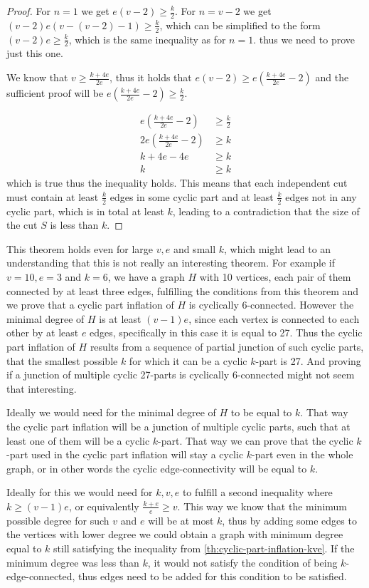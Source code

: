 \documentclass[12pt, twoside]{book}
\begin{document}
\begin{proof}
	For $n=1$ we get $e(v-2)\geq \frac{k}{2}$. For $n=v-2$ we get $(v-2)e(v-(v-2)-1)\geq\frac{k}{2}$, which can be simplified to the form $(v-2)e\geq\frac{k}{2}$, which is the same inequality as for $n=1$. thus we need to prove just this one.
	
	We know that $v\geq \frac{k+4e}{2e}$, thus it holds that $e(v-2)\geq e(\frac{k+4e}{2e}-2)$ and the sufficient proof will be $e(\frac{k+4e}{2e}-2)\geq \frac{k}{2}$.
	
	\begin{align*}
		e\left(\frac{k+4e}{2e}-2\right)&\geq \frac{k}{2} \\
		2e\left(\frac{k+4e}{2e}-2\right)&\geq k \\
		k+4e-4e&\geq k \\
		k&\geq k
	\end{align*}
	which is true thus the inequality holds. This means that each independent cut must contain at least $\frac{k}{2}$ edges in some cyclic part and at least $\frac{k}{2}$ edges not in any cyclic part, which is in total at least $k$, leading to a contradiction that the size of the cut $S$ is less than $k$.
\end{proof}

This theorem holds even for large $v,e$ and small $k$, which might lead to an understanding that this is not really an interesting theorem. For example if $v=10,e=3$ and $k=6$, we have a graph $H$ with 10 vertices, each pair of them connected by at least three edges, fulfilling the conditions from this theorem and we prove that a cyclic part inflation of $H$ is cyclically 6-connected. However the minimal degree of $H$ is at least $(v-1)e$, since each vertex is connected to each other by at least $e$ edges, specifically in this case it is equal to 27. Thus the cyclic part inflation of $H$ results from a sequence of partial junction of such cyclic parts, that the smallest possible $k$ for which it can be a cyclic $k$-part is 27. And proving if a junction of multiple cyclic 27-parts is cyclically 6-connected might not seem that interesting.

Ideally we would need for the minimal degree of $H$ to be equal to $k$. That way the cyclic part inflation will be a junction of multiple cyclic parts, such that at least one of them will be a cyclic $k$-part. That way we can prove that the cyclic $k$-part used in the cyclic part inflation will stay a cyclic $k$-part even in the whole graph, or in other words the cyclic edge-connectivity will be equal to $k$.

Ideally for this we would need for $k,v,e$ to fulfill a second inequality where ${k\geq (v-1)e}$, or equivalently $\frac{k+e}{e}\geq v$. This way we know that the minimum possible degree for such $v$ and $e$ will be at most $k$, thus by adding some edges to the vertices with lower degree we could obtain a graph with minimum degree equal to $k$ still satisfying the inequality from \cref{th:cyclic-part-inflation-kve}. If the minimum degree was less than $k$, it would not satisfy the condition of being $k$-edge-connected, thus edges need to be added for this condition to be satisfied.
\end{document}
